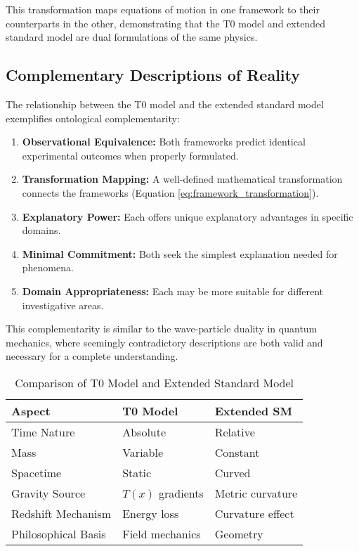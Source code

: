 \documentclass[twocolumn,aps,prl]{revtex4-2}
\newcommand{\Tfield}{T(x)}
\begin{document}
	This transformation maps equations of motion in one framework to their counterparts in the other, demonstrating that the T0 model and extended standard model are dual formulations of the same physics.
	
	\subsection{Complementary Descriptions of Reality}
	\label{subsec:complementary_descriptions}
	
	The relationship between the T0 model and the extended standard model exemplifies ontological complementarity:
	
	\begin{enumerate}
		\item \textbf{Observational Equivalence:} Both frameworks predict identical experimental outcomes when properly formulated.
		\item \textbf{Transformation Mapping:} A well-defined mathematical transformation connects the frameworks (Equation \ref{eq:framework_transformation}).
		\item \textbf{Explanatory Power:} Each offers unique explanatory advantages in specific domains.
		\item \textbf{Minimal Commitment:} Both seek the simplest explanation needed for phenomena.
		\item \textbf{Domain Appropriateness:} Each may be more suitable for different investigative areas.
	\end{enumerate}
	
	This complementarity is similar to the wave-particle duality in quantum mechanics, where seemingly contradictory descriptions are both valid and necessary for a complete understanding.
	
	\begin{table}[ht]
		\centering
		\caption{Comparison of T0 Model and Extended Standard Model}
		\label{tab:model_comparison}
		\small
		\begin{tabular}{p{} p{} p{}}
			\hline
			\textbf{Aspect} & \textbf{T0 Model} & \textbf{Extended SM} \\
			\hline
			Time Nature & Absolute & Relative \\
			Mass & Variable & Constant \\
			Spacetime & Static & Curved \\
			Gravity Source & \(\Tfield\) gradients & Metric curvature \\
			Redshift Mechanism & Energy loss & Curvature effect \\
			Philosophical Basis & Field mechanics & Geometry \\
			\hline
		\end{tabular}
	\end{table}
	
\end{document}
